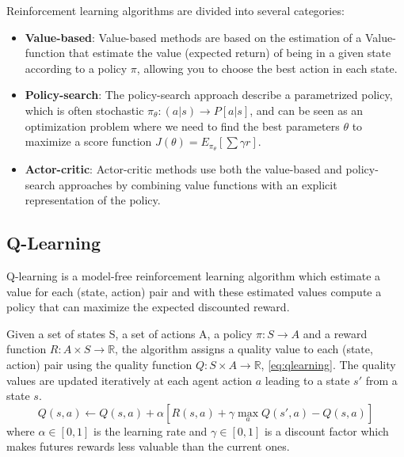 \noindent
Reinforcement learning algorithms are divided into several categories:
\begin{itemize}
    \item \textbf{Value-based}: Value-based methods are based on the estimation of a Value-function that estimate the value (expected return) of being in a given state according to a policy $\pi$,
    allowing you to choose the best action in each state.

    \item \textbf{Policy-search}: The policy-search approach describe a parametrized policy, which is often stochastic $\pi_{\theta}:(a | s)\rightarrow P[a | s]$, 
    and can be seen as an optimization problem where we need to find the best parameters $\theta$ to maximize
    a score function $J(\theta) = E_{\pi_\theta}[\sum \gamma r]$.
    
    \item \textbf{Actor-critic}: Actor-critic methods use both the value-based and policy-search approaches by combining value
    functions with an explicit representation of the policy.
\end{itemize}

\subsection{Q-Learning}
Q-learning \cite{watkins1992q} is a model-free reinforcement learning algorithm which estimate a value for each (state, action) pair
and with these estimated values compute a policy that can maximize the expected discounted reward.

Given a set of states S, a set of actions A, a policy $\pi : S \rightarrow A$ and a reward function $R : A \times S \rightarrow \mathbb{R}$, the algorithm assigns a quality value to each (state, action) pair using the quality function $Q : S \times A \rightarrow \mathbb{R}$, \cref{eq:qlearning}.
The quality values are updated iteratively at each agent action $a$ leading to a state $s'$ from a state $s$.
\begin{equation}
    Q(s, a) \leftarrow Q(s, a) + \alpha [R(s, a) + \gamma \max_a Q(s', a) - Q(s, a)]
    \label{eq:qlearning}
\end{equation}
%
where $\alpha \in [0, 1]$ is the learning rate and $\gamma \in [0, 1]$ is a discount factor which makes futures rewards less valuable than the current ones.



